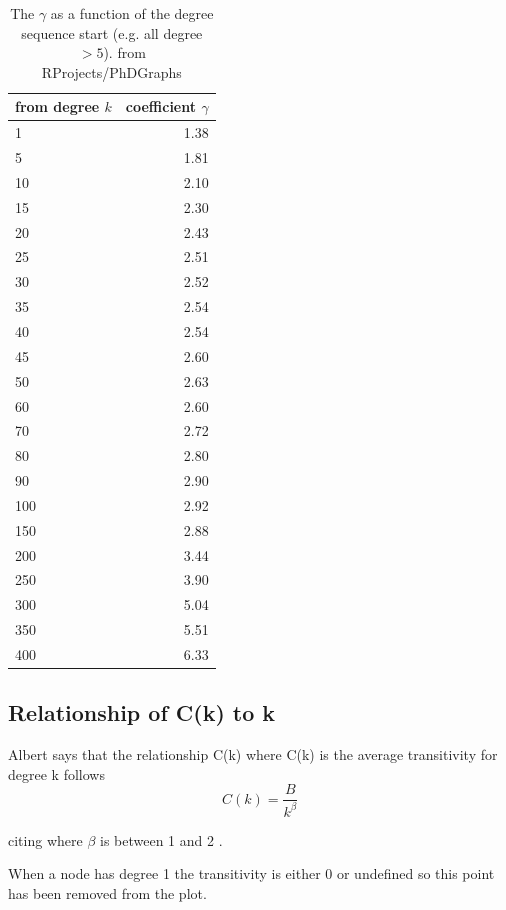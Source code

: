 \begin{table}[ht]
\centering
\begin{tabular}{lr}
  \hline
  from degree $k$ & coefficient $\gamma$ \\ 
  \hline
1 & 1.38 \\ 
  5 & 1.81 \\ 
  10 & 2.10 \\ 
  15 & 2.30 \\ 
  20 & 2.43 \\ 
  25 & 2.51 \\ 
   30 & 2.52 \\ 
  35 & 2.54 \\ 
   40 & 2.54 \\ 
   45 & 2.60 \\ 
  50 & 2.63 \\ 
   60 & 2.60 \\ 
   70 & 2.72 \\ 
   80 & 2.80 \\ 
   90 & 2.90 \\ 
   100 & 2.92 \\ 
  150 & 2.88 \\ 
   200 & 3.44 \\ 
   250 & 3.90 \\ 
  300 & 5.04 \\ 
   350 & 5.51 \\ 
   400 & 6.33 \\ 
   \hline
\end{tabular}
\caption{The $\gamma$ as a function of the degree sequence start (e.g. all degree $>5$). from RProjects/PhDGraphs}
  \label{table:gamma}
\end{table}

\subsection{Relationship of C(k) to k}
Albert \cite{albert2005scale} says that the relationship C(k) where C(k) is the average transitivity for degree k follows
\begin{equation}
            C(k) = \frac{B}{k^{\beta}}
\end{equation}
\label{eq:C(k) function average transitivity and degree}

citing \cite{yook2004functional} where $\beta$ is between 1 and 2 \cite{albert2005scale}.

When a node has degree 1 the transitivity is  either 0 or undefined so this point has been removed from the plot. 


